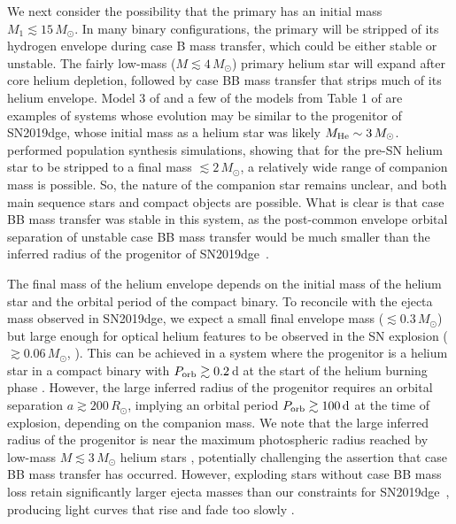 \documentclass[twocolumn]{aastex63}
\newcommand{\name}{SN2019dge}
\begin{document}
We next consider the possibility that the primary has an initial mass $M_1 \lesssim 15 \, M_\odot$. In 
many binary {\color{red} configurations, the primary will be stripped of its hydrogen envelope during 
case B mass transfer, which could be either stable or unstable. The fairly low-mass ($M \lesssim 4 \, 
M_\odot$) primary helium star will expand after core helium depletion, followed by case BB mass 
transfer that strips much of its helium envelope. Model 3 of \cite{Yoon2010} and a few of the models 
from Table 1 of \cite{Tauris2015} are examples of systems whose evolution may be similar to the 
progenitor of \name, whose initial mass as a helium star was likely $M_{\rm He} \sim 3 \, M_\odot$. 
\citet{Zapartas2017} performed population synthesis simulations, showing that for the pre-SN helium 
star to be stripped to a final mass $\lesssim 2\, M_\odot$, a relatively wide range of companion mass is 
possible. So, the nature of the companion star remains unclear, and both main sequence stars and 
compact objects are possible. What is clear is that case BB mass transfer was stable in this system, as 
the post-common envelope orbital separation of unstable case BB mass transfer would be much 
smaller than the inferred radius of the progenitor of \name \, \citep{Laplace2020}.  }

The final mass of the helium envelope depends on the initial mass of the helium star and the orbital 
period of the compact binary. To reconcile with the ejecta mass observed in \name, we expect a small 
final envelope mass ($\lesssim0.3\,M_\odot$) but large enough for optical helium features to be 
observed in the SN explosion ($\gtrsim 0.06\, M_\odot$, \citealt{Hachinger2012}). {\color{red} This can 
be achieved in a system where the progenitor is a helium star in a compact binary with $P_{\rm orb} 
\gtrsim 0.2$\,d at the start of the helium burning phase \citep{Tauris2015}. However, the large inferred 
radius of the progenitor requires an orbital separation $a \gtrsim 200 \, R_\odot$, implying an orbital 
period $P_{\rm orb} \gtrsim 100 \, {\rm d}$ at the time of explosion, depending on the companion mass. 
We note that the large inferred radius of the progenitor is near the maximum photospheric radius 
reached by low-mass $M \lesssim 3 \, M_\odot$ helium stars 
\citep{KleiserFuller2018,Woosley2019,Laplace2020}, potentially challenging the assertion that case BB 
mass transfer has occurred. However, exploding stars without case BB mass loss retain significantly 
larger ejecta masses than our constraints for \name \, \citep{Tauris2015,Woosley2019}, producing light 
curves that rise and fade too slowly \citep{KleiserFuller2018}.}
\end{document}
